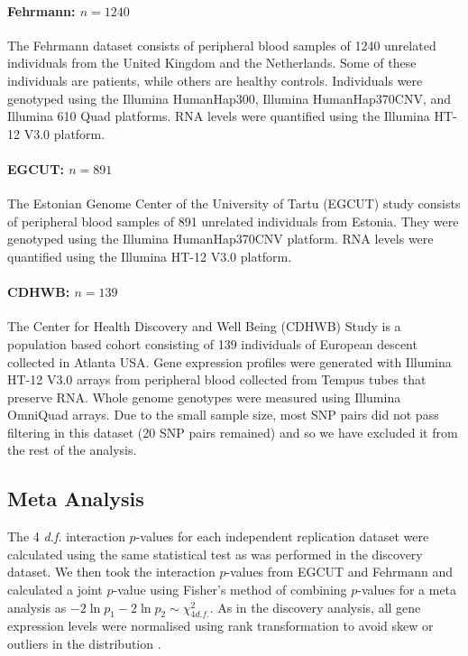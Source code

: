 \documentclass{article}
\begin{document}
\paragraph{Fehrmann: $n=1240$}
The Fehrmann dataset \cite{Fehrmann2011} consists of peripheral blood samples of 1240 unrelated individuals from the United Kingdom and the Netherlands. Some of these individuals are patients, while others are healthy controls. Individuals were genotyped using the Illumina HumanHap300, Illumina HumanHap370CNV, and Illumina 610 Quad platforms. RNA levels were quantified using the Illumina HT-12 V3.0 platform.

\paragraph{EGCUT: $n=891$}
The Estonian Genome Center of the University of Tartu (EGCUT) study \cite{Metspalu2004} consists of peripheral blood samples of 891 unrelated individuals from Estonia. They were genotyped using the Illumina HumanHap370CNV platform. RNA levels were quantified using the Illumina HT-12 V3.0 platform.

\paragraph{CDHWB: $n=139$}
The Center for Health Discovery and Well Being (CDHWB) Study \cite{Preininger2013} is a population based cohort consisting of 139 individuals of European descent collected in Atlanta USA. Gene expression profiles were generated with Illumina HT-12 V3.0 arrays from peripheral blood collected from Tempus tubes that preserve RNA. Whole genome genotypes were measured using Illumina OmniQuad arrays. Due to the small sample size, most SNP pairs did not pass filtering in this dataset (20 SNP pairs remained) and so we have excluded it from the rest of the analysis.

\subsection{Meta Analysis}

The 4 \emph{d.f.} interaction $p$-values for each independent replication dataset were calculated using the same statistical test as was performed in the discovery dataset. We then took the interaction $p$-values from EGCUT and Fehrmann and calculated a joint $p$-value using Fisher's method of combining $p$-values for a meta analysis as $-2 \ln p_{1} - 2 \ln p_{2} \sim \chi^{2}_{4 d.f.}$. As in the discovery analysis, all gene expression levels were normalised using rank transformation to avoid skew or outliers in the distribution \cite{Westra2011}.
\end{document}

